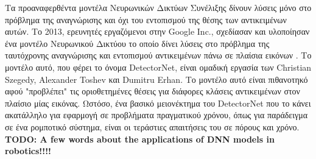 Τα προαναφερθέντα μοντέλα Νευρωνικών Δικτύων Συνέλιξης δίνουν
λύσεις μόνο στο πρόβλημα της αναγνώρισης και όχι
του εντοπισμού της θέσης των αντικειμένων αυτών.
Το 2013, ερευνητές εργαζόμενοι στην Google Inc., σχεδίασαν και υλοποίησαν ένα
μοντέλο Νευρωνικού Δικτύου το οποίο δίνει λύσεις στο πρόβλημα της ταυτόχρονης
αναγνώρισης και εντοπισμού αντικειμένων πάνω σε πλαίσια εικόνων \cite{szegedy2013deep}.
Το μοντέλο αυτό, που φέρει το όνομα DetectorNet, είναι ομαδική εργασία των
Christian Szegedy, Alexander Toshev και Dumitru Erhan. Το μοντέλο αυτό είναι
πιθανοτηκό αφού "προβλέπει" τις οριοθετημένες θέσεις για διάφορες κλάσεις
αντικειμένων στον πλαίσιο μίας εικόνας. Ωστόσο, ένα βασικό μειονέκτημα του DetectorNet
που το κάνει ακατάλληλο για εφαρμογή σε προβλήματα πραγματικού χρόνου, όπως
για παράδειγμα σε ένα ρομποτικό σύστημα, είναι οι τεράστιες απαιτήσεις του σε πόρους
και χρόνο.
\\

\textbf{TODO: A few words about the applications of DNN models in robotics!!!!}

%
%
